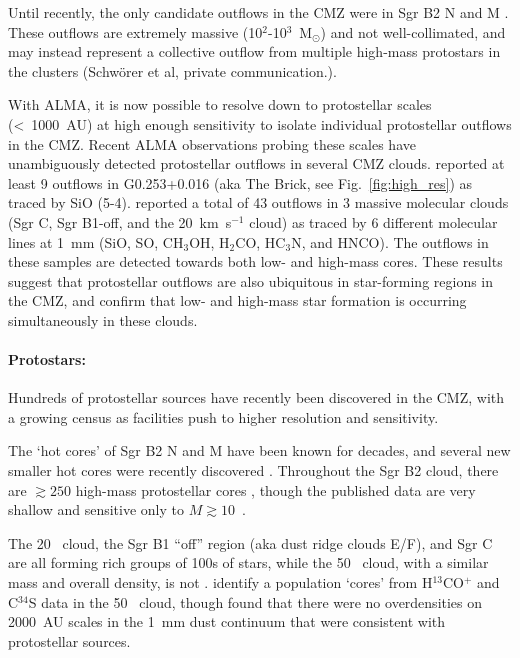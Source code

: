 Until recently, the only candidate outflows in the CMZ were in Sgr B2 N and M \citep{Lis1993, Qin2008, Higuchi2014}. These outflows are extremely massive (10$^{2}$-10$^{3}$~M$_{\odot}$) and not well-collimated, and may instead represent a collective outflow from multiple high-mass protostars in the clusters (Schw\"{o}rer et al, private communication.).

With ALMA, it is now possible to resolve down to protostellar scales (\textless \ 1000~AU) at high enough sensitivity to isolate individual protostellar outflows in the CMZ. Recent ALMA observations probing these scales have unambiguously detected protostellar outflows in several CMZ clouds. \citet{Walker2021} reported at least 9 outflows in G0.253+0.016 (aka The Brick, see Fig.~\ref{fig:high_res}) as traced by SiO (5-4). \citet{Lu2021} reported a total of 43 outflows in 3 massive molecular clouds (Sgr C, Sgr B1-off, and the 20~km~s$^{-1}$ cloud) as traced by 6 different molecular lines at 1~mm (SiO, SO, CH$_{3}$OH, H$_{2}$CO, HC$_{3}$N, and HNCO). The outflows in these samples are detected towards both low- and high-mass cores. These results suggest that protostellar outflows are also ubiquitous in star-forming regions in the CMZ, and confirm that low- and high-mass star formation is occurring simultaneously in these clouds.

\paragraph{Protostars:}\label{sec:protostars} Hundreds of protostellar sources have recently been discovered in the CMZ, with a growing census as facilities push to higher resolution and sensitivity. 

The `hot cores' of Sgr B2 N and M have been known for decades, and several new smaller hot cores were recently discovered \citep[e.g.][]{Sanchez-Monge2017, Bonfand2017, Bonfand2019}. Throughout the Sgr B2 cloud, there are $\gtrsim250$ high-mass protostellar cores \citep{Ginsburg2018b}, though the published data are very shallow and sensitive only to $M\gtrsim10$~\msun.

The 20 \kms\ cloud, the Sgr B1 ``off'' region (aka dust ridge clouds E/F), and Sgr C are all forming rich groups of 100s of stars, while the 50 \kms\ cloud, with a similar mass and overall density, is not \citep{Lu2020}. \citet{Uehara2019} identify a population `cores' from H$^{13}$CO$^{+}$ and C$^{34}$S data in the 50 \kms\ cloud, though \citet{Lu2020} found that there were no overdensities on 2000~AU scales in the 1~mm dust continuum that were consistent with protostellar sources. 

